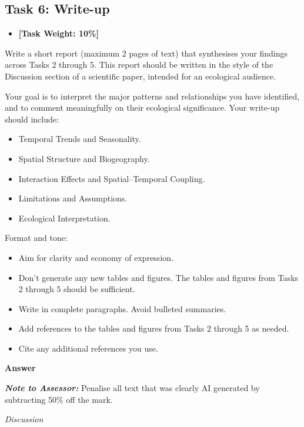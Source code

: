 \documentclass[
  british,
  10pt,
]{article}
\providecommand{\tightlist}{%
  \setlength{\itemsep}{0pt}\setlength{\parskip}{0pt}}
\begin{document}
\subsection{Task 6: Write-up}\label{task-6-write-up}

\begin{itemize}
\tightlist
\item
  \textbf{{[}Task Weight: 10\%{]}}
\end{itemize}

Write a short report (maximum 2 pages of text) that synthesises your
findings across Tasks 2 through 5. This report should be written in the
style of the Discussion section of a scientific paper, intended for an
ecological audience.

Your goal is to interpret the major patterns and relationships you have
identified, and to comment meaningfully on their ecological
significance. Your write-up should include:

\begin{itemize}
\tightlist
\item
  Temporal Trends and Seasonality.
\item
  Spatial Structure and Biogeography.
\item
  Interaction Effects and Spatial--Temporal Coupling.
\item
  Limitations and Assumptions.
\item
  Ecological Interpretation.
\end{itemize}

Format and tone:

\begin{itemize}
\tightlist
\item
  Aim for clarity and economy of expression.
\item
  Don't generate any new tables and figures. The tables and figures from
  Tasks 2 through 5 should be sufficient.
\item
  Write in complete paragraphs. Avoid bulleted summaries.
\item
  Add references to the tables and figures from Tasks 2 through 5 as
  needed.
\item
  Cite any additional references you use.
\end{itemize}

\textbf{Answer}

\textbf{\emph{Note to Assessor:}} Penalise all text that was clearly AI
generated by subtracting 50\% off the mark.

\emph{Discussion}
\end{document}

